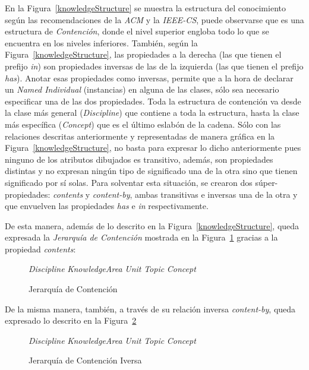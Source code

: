 En la Figura~\ref{knowledgeStructure} se muestra la estructura del conocimiento según las recomendaciones de la \textit{ACM} y la \textit{IEEE-CS}, puede observarse que es una estructura de \textit{Contención}, donde el nivel superior engloba todo lo que se encuentra en los niveles inferiores. También, según la Figura~\ref{knowledgeStructure}, las propiedades a la derecha (las que tienen el prefijo \textit{in}) son propiedades inversas de las de la izquierda (las que tienen el prefijo \textit{has}). Anotar esas propiedades como inversas, permite que a la hora de declarar un \textit{Named Individual} (instancias) en alguna de las clases, sólo sea necesario especificar una de las dos propiedades. Toda la estructura de contención va desde la clase más general (\textit{Discipline}) que contiene a toda la estructura, hasta la clase más específica (\textit{Concept}) que es el último eslabón de la cadena. Sólo con las relaciones descritas anteriormente y representadas de manera gráfica en la Figura~\ref{knowledgeStructure}, no basta para expresar lo dicho anteriormente pues ninguno de los atributos dibujados es transitivo, además, son propiedades distintas y no expresan ningún tipo de significado una de la otra sino que tienen significado por sí solas. Para solventar esta situación, se crearon dos súper-propiedades: \textit{contents} y \textit{content-by}, ambas transitivas e inversas una de la otra y que envuelven las propiedades \textit{has} e \textit{in} respectivamente.

De esta manera, además de lo descrito en la Figura~\ref{knowledgeStructure}, queda expresada la \textit{Jerarquía de Contención} mostrada en la Figura~\ref{contentHierarchy} gracias a la propiedad \textit{contents}:

\begin{figure}[!h]
    \begin{center}
        \textit{Discipline} \subseteq \textit{KnowledgeArea} \subseteq \textit{Unit} \subseteq \textit{Topic} \subseteq \textit{Concept}
        \caption{Jerarquía de Contención}
        \label{contentHierarchy}
    \end{center}
\end{figure}

De la misma manera, también, a través de su relación inversa \textit{content-by}, queda expresado lo descrito en la Figura~\ref{inverseContentHierarchy}

\begin{figure}[!h]
    \begin{center}
        \textit{Discipline} \supseteq \textit{KnowledgeArea} \supseteq \textit{Unit} \supseteq \textit{Topic} \supseteq \textit{Concept}
        \caption{Jerarquía de Contención Iversa}
        \label{inverseContentHierarchy}
    \end{center}
\end{figure}

